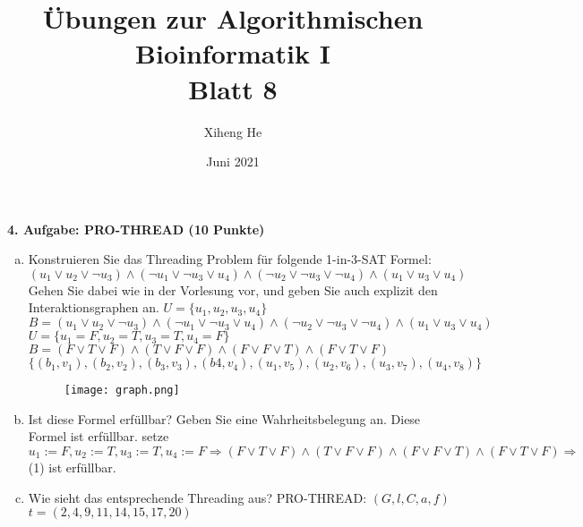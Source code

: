 \documentclass{article}
\title{Übungen zur Algorithmischen Bioinformatik I\\
Blatt 8}
\author{Xiheng He }
\date{Juni 2021}
\begin{document}
\maketitle
\begin{flushleft}
\textbf{4. Aufgabe: PRO-THREAD (10 Punkte)}
\begin{enumerate}[(a)]
    \item Konstruieren Sie das Threading Problem für folgende 1-in-3-SAT Formel:\
    \begin{equation}
        (u_1 \lor u_2 \lor \lnot u_3)\land(\lnot u_1 \lor \lnot u_3 \lor u_4)\land
        (\lnot u_2 \lor \lnot u_3 \lor \lnot u_4)\land(u_1 \lor u_3 \lor u_4)
    \end{equation}
    Gehen Sie dabei wie in der Vorlesung vor, und geben Sie auch explizit den Interaktionsgraphen an.
    \newline
    $U = \{u_1,u_2,u_3,u_4\}$ \\
    $B = (u_1 \lor u_2 \lor \lnot u_3)\land(\lnot u_1 \lor \lnot u_3 \lor u_4)\land
    (\lnot u_2 \lor \lnot u_3 \lor \lnot u_4)\land(u_1 \lor u_3 \lor u_4)$ \\
    $U = \{u_1 = F, u_2 = T, u_3 = T, u_4 = F\}$ \\
    $B = (F \lor T \lor F)\land(T \lor F \lor F)\land(F \lor F \lor T)
    \land(F \lor T \lor F)$ \\
    $\{(b_1,v_1),(b_2,v_2),(b_3,v_3),(b4,v_4),(u_1,v_5),(u_2,v_6),(u_3,v_7),(u_4,v_8)\}$
    \newline
    \begin{figure}[htp]
    \centering
    \texttt{[image: graph.png]}
    \end{figure}
    \newpage
    \item Ist diese Formel erfüllbar? Geben Sie eine Wahrheitsbelegung an.
    \newline
    Diese Formel ist erfüllbar.
    \newline
    setze $u_1:= F, u_2:= T, u_3:= T, u_4:= F \Longrightarrow (F \lor T \lor F)\land(T \lor F \lor F)\land(F \lor F \lor T)
    \land(F \lor T \lor F)\Longrightarrow$ (1) ist erfüllbar.
    \item Wie sieht das entsprechende Threading aus?
    \newline
    PRO-THREAD: $(G,l,C,a,f)$
    \newline
    $t = (2,4,9,11,14,15,17,20)$
\end{enumerate}
\end{flushleft}
\end{document}

